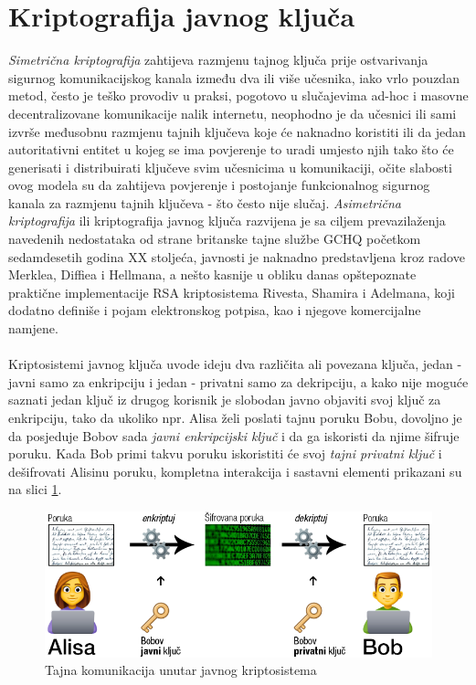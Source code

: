 \section{Kriptografija javnog ključa}
\textit{Simetrična kriptografija} zahtijeva razmjenu tajnog ključa prije ostvarivanja sigurnog komunikacijskog kanala između dva ili više učesnika, iako vrlo pouzdan metod, često je teško provodiv u praksi, pogotovo u slučajevima ad-hoc i masovne decentralizovane komunikacije nalik internetu, neophodno je da učesnici ili sami izvrše međusobnu razmjenu tajnih ključeva koje će naknadno koristiti ili da jedan autoritativni entitet u kojeg se ima povjerenje to uradi umjesto njih tako što će generisati i distribuirati ključeve svim učesnicima u komunikaciji, očite slabosti ovog modela su da zahtijeva povjerenje i postojanje funkcionalnog sigurnog kanala za razmjenu tajnih ključeva - što često nije slučaj. \textit{Asimetrična kriptografija} ili kriptografija javnog ključa razvijena je sa ciljem prevazilaženja navedenih nedostataka od strane britanske tajne službe GCHQ početkom sedamdesetih godina XX stoljeća, javnosti je naknadno predstavljena kroz radove Merklea\cite{merkle1978secure}, Diffiea i Hellmana\cite{diffie1976new}, a nešto kasnije u obliku danas opštepoznate praktične implementacije RSA kriptosistema Rivesta, Shamira i Adelmana\cite{rivest1978method}, koji dodatno definiše i pojam elektronskog potpisa, kao i njegove komercijalne namjene.

\paragraph*{}
Kriptosistemi javnog ključa uvode ideju dva različita ali povezana ključa, jedan - javni samo za enkripciju i jedan - privatni samo za dekripciju, a kako nije moguće saznati jedan ključ iz drugog korisnik je slobodan javno objaviti svoj ključ za enkripciju, tako da ukoliko npr. Alisa želi poslati tajnu poruku Bobu, dovoljno je da posjeduje Bobov sada \textit{javni enkripcijski ključ} i da ga iskoristi da njime šifruje poruku. Kada Bob primi takvu poruku iskoristiti će svoj \textit{tajni privatni ključ} i dešifrovati Alisinu poruku, kompletna interakcija i sastavni elementi prikazani su na slici \ref{fig:alice_bob_enc}.

\begin{figure}[H]
    \centering
    \includegraphics[width=1.0\textwidth]{material/bob_alice_enc}
    \caption{Tajna komunikacija unutar javnog kriptosistema}
    \label{fig:alice_bob_enc}
\end{figure}

